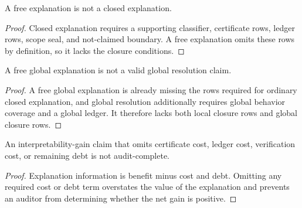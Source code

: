 \begin{theorem}
\label{thm:philosophy-no-free-explanation}
A free explanation is not a closed explanation.
\end{theorem}
\begin{proof}
Closed explanation requires a supporting classifier, certificate rows,
ledger rows, scope seal, and not-claimed boundary. A free explanation
omits these rows by definition, so it lacks the closure conditions.
\end{proof}

\begin{theorem}
\label{thm:philosophy-no-free-global-explanation}
A free global explanation is not a valid global resolution claim.
\end{theorem}
\begin{proof}
A free global explanation is already missing the rows required for
ordinary closed explanation, and global resolution additionally requires
global behavior coverage and a global ledger. It therefore lacks both
local closure rows and global closure rows.
\end{proof}

\begin{theorem}
\label{thm:philosophy-no-free-interpretability-gain}
An interpretability-gain claim that omits certificate cost, ledger cost,
verification cost, or remaining debt is not audit-complete.
\end{theorem}
\begin{proof}
Explanation information is benefit minus cost and debt. Omitting any
required cost or debt term overstates the value of the explanation and
prevents an auditor from determining whether the net gain is positive.
\end{proof}

